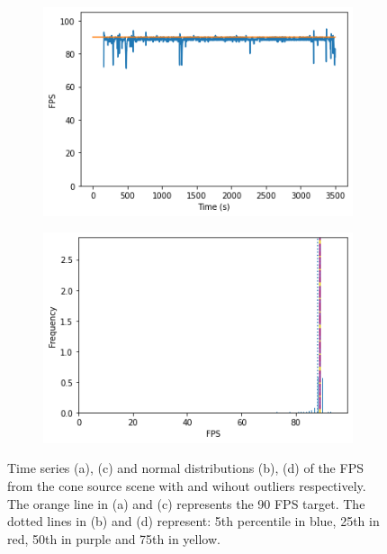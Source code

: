 \begin{figure}[t]
\begin{subfigure}{.45\textwidth}
        \caption{}
    \end{subfigure}
    \begin{subfigure}{.45\textwidth}
        \centering
        \includegraphics[width=\textwidth]{pictures/analysis cone/output_13_0.png}
        \caption{}
    \end{subfigure}
    \begin{subfigure}{.45\textwidth}
        \centering
        \includegraphics[width=\textwidth]{pictures/analysis cone/output_14_0.png}
        \caption{}
    \end{subfigure}
    \caption{Time series (a), (c) and normal distributions (b), (d) of the FPS from the cone source scene with and wihout outliers respectively. The orange line in (a) and (c) represents the 90 FPS target. The dotted lines in (b) and (d) represent: 5th percentile in blue, 25th in red, 50th in purple and 75th in yellow.}
    \label{fig:cone-with-updates-analysis}
\end{figure}

